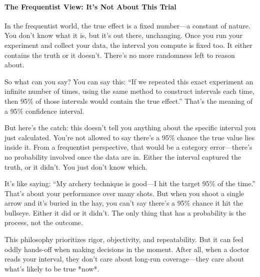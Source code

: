 \paragraph{The Frequentist View: It’s Not About This Trial}

In the frequentist world, the true effect is a fixed number—a constant of nature. You don’t know what it is, but it’s out there, unchanging. Once you run your experiment and collect your data, the interval you compute is fixed too. It either contains the truth or it doesn’t. There’s no more randomness left to reason about.

So what can you say?  
You can say this: “If we repeated this exact experiment an infinite number of times, using the same method to construct intervals each time, then 95\% of those intervals would contain the true effect.” That’s the meaning of a 95\% confidence interval.

But here’s the catch: this doesn’t tell you anything about the specific interval you just calculated. You’re not allowed to say there’s a 95\% chance the true value lies inside it. From a frequentist perspective, that would be a category error—there’s no probability involved once the data are in. Either the interval captured the truth, or it didn’t. You just don’t know which.

It’s like saying: “My archery technique is good—I hit the target 95\% of the time.” That’s about your performance over many shots. But when you shoot a single arrow and it’s buried in the hay, you can’t say there's a 95\% chance it hit the bullseye. Either it did or it didn’t. The only thing that has a probability is the process, not the outcome.

This philosophy prioritizes rigor, objectivity, and repeatability. But it can feel oddly hands-off when making decisions in the moment. After all, when a doctor reads your interval, they don’t care about long-run coverage—they care about what’s likely to be true *now*.


